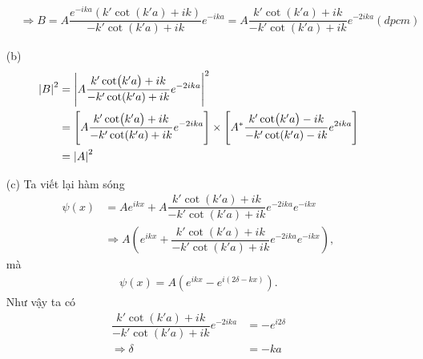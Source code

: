\documentclass{report}
\newcommand{\f}[2]{\dfrac{#1}{#2}}
\begin{document}
\begin{enumerate}
\begin{align*}
			 & \Rightarrow B = A \f{e^{-ika}\left( k' \cot(k'a) + ik \right)}{ -k' \cot(k'a) + ik} e^{-ika} = A \f{k' \cot(k'a) + ik}{ -k' \cot(k'a) + ik} e^{-2ika}(dpcm)
		\end{align*}
	\item[(b)]
		\begin{align*}
			\abs{B}^2
			 & = \abs{A \f{k' \cot(k'a) + ik}{ -k' \cot(k'a) + ik} e^{-2ika}}^2                                                                                       \\
			 & = \left[ A \f{k' \cot(k'a) + ik}{ -k' \cot(k'a) + ik} e^{-2ika} \right] \times \left[A^{*} \f{k' \cot(k'a) - ik}{ -k' \cot(k'a) - ik} e^{2ika} \right] \\
			 & = \abs{A}^2
		\end{align*}
	\item[(c)] Ta viết lại hàm sóng
		\begin{align*}
			\psi(x) & = A e^{ikx} +  A \f{k' \cot(k'a) + ik}{ -k' \cot(k'a) + ik} e^{-2ika} e^{-ikx}                        \\
			        & \Rightarrow A \left( e^{ikx} + \f{k' \cot(k'a) + ik}{ -k' \cot(k'a) + ik} e^{-2ika} e^{-ikx} \right),
		\end{align*}
		mà
		\begin{align*}
			\psi(x) = A \left( e^{ikx} - e^{i(2\delta - kx)} \right).
		\end{align*}
		Như vậy ta có
		\begin{align*}
			\f{k' \cot(k'a) + ik}{ -k' \cot(k'a) + ik} e^{-2ika} & = - e^{i2\delta} \\
			\Rightarrow \delta                                   & = -ka
		\end{align*}
\end{enumerate}
\end{document}
